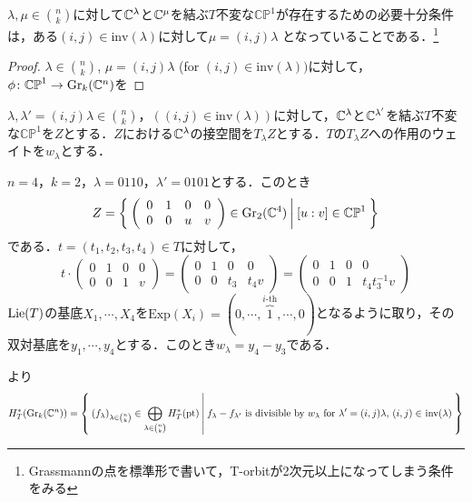 \begin{prop}
  $\lambda,\mu\in\binom{n}{k}$に対して$\mathbb{C}^\lambda$と$\mathbb{C}^\mu$を結ぶ$T$不変な$\mathbb{CP}^1$が存在するための必要十分条件は，ある$(i, j)\in\text{inv}(\lambda)$に対して$\mu = (i, j)\lambda$
  となっていることである．\footnote{Grassmannの点を標準形で書いて，T-orbitが2次元以上になってしまう条件をみる}
\end{prop}

\begin{proof}
  $\lambda\in\binom{n}{k}$, $\mu=(i, j)\lambda$ (for $(i,j)\in\text{inv}(\lambda))$に対して，$\phi\colon \mathbb{CP}^1\rightarrow \text{Gr}_k(\mathbb{C}^n)$を
\end{proof}

$\lambda,\lambda'=(i,j)\lambda\in\binom{n}{k}$，$((i,j)\in\text{inv}(\lambda))$に対して，$\mathbb{C}^\lambda$と$\mathbb{C}^{\lambda'}$を結ぶ$T$不変な$\mathbb{CP}^1$を$Z$とする．$Z$における$\mathbb{C}^\lambda$の接空間を$T_\lambda Z$とする．$T$の$T_\lambda Z$への作用のウェイトを$w_\lambda$とする．

\begin{eg}
  $n=4$，$k=2$，$\lambda=0110$，$\lambda'=0101$とする．このとき
  \[
  Z=\left\{\:
    \left(\begin{array}{cccc}
      0 & 1 & 0 & 0\\
      0 & 0 & u & v
    \end{array}\right)\in\text{Gr}_2(\mathbb{C}^4)
  \:\middle|\:[u:v]\in\mathbb{CP}^1\:\right\}
  \]
  である．$t=(t_1,t_2,t_3,t_4)\in T$に対して，
  \[
  t\cdot\left(\begin{array}{cccc}
    0 & 1 & 0 & 0\\
    0 & 0 & 1 & v
  \end{array}\right)=\left(\begin{array}{cccc}
    0 & 1 & 0 & 0\\
    0 & 0 & t_3 & t_4v
  \end{array}\right)=\left(\begin{array}{cccc}
    0 & 1 & 0 & 0\\
    0 & 0 & 1 & t_4t_3^{-1}v
  \end{array}\right)
  \]
  $\text{Lie} (T)$の基底$X_1,\cdots,X_4$を$\text{Exp}(X_i)=(0,\cdots,\overbrace{1}^{i\text{-th}},\cdots,0)$となるように取り，その双対基底を$y_1,\cdots,y_4$とする．このとき$w_\lambda=y_4-y_3$である．
\end{eg}


\cite{GKM}より
\[
H^*_T(\text{Gr}_k(\mathbb{C}^n))=\left\{\:(f_\lambda)_{\lambda\in\binom{n}{k}}\in\bigoplus_{\lambda\in\binom{n}{k}}H^*_T(\text{pt})\:\middle|\:f_\lambda-f_{\lambda'}\text{ is divisible by $w_\lambda$ for $\lambda' = (i,j)\lambda$, $(i,j)\in$ inv$(\lambda)$}\:\right\}
\]







